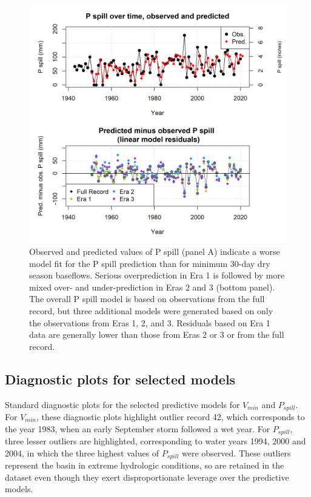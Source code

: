 \documentclass[hess, manuscript]{copernicus}
\begin{document}
\begin{figure}
\includegraphics[width=1\linewidth]{f16} \caption{\label{fig:pspill_pred_over_time} Observed and predicted values of P spill (panel A) indicate a worse model fit for the P spill prediction than for minimum 30-day dry season baseflows. Serious overprediction in Era 1 is followed by more mixed over- and under-prediction in Eras 2 and 3 (bottom panel). The overall P spill model is based on observations from the full record, but three additional models were generated based on only the observations from Eras 1, 2, and 3. Residuals based on Era 1 data are generally lower than those from Eras 2 or 3 or from the full record.}\label{fig:pspill_pred_over_time}
\end{figure}

\newpage

\subsection{Diagnostic plots for selected models}

Standard diagnostic plots for the selected predictive models for
\(V_{min}\) and \(P_{spill}\). For \(V_{min}\), these diagnostic plots
highlight outlier record 42, which corresponds to the year 1983, when an
early September storm followed a wet year. For \(P_{spill}\), three
lesser outliers are highlighted, corresponding to water years 1994, 2000
and 2004, in which the three highest values of \(P_{spill}\) were
observed. These outliers represent the basin in extreme hydrologic
conditions, so are retained in the dataset even though they exert
disproportionate leverage over the predictive models.
\end{document}
